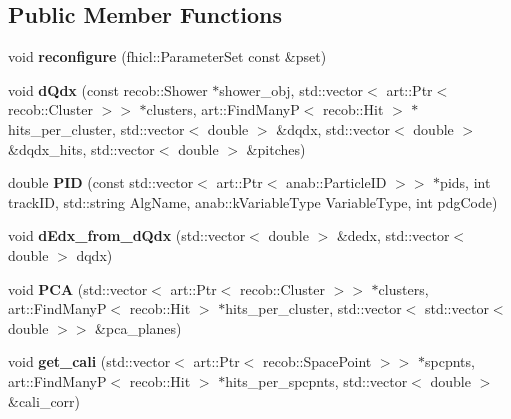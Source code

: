 \subsection*{Public Member Functions}
\begin{DoxyCompactItemize}
\item 
\hypertarget{classlee_1_1EnergyHelper_aa551642488e1a71f7b3d16965789a9f7}{void {\bfseries reconfigure} (fhicl\-::\-Parameter\-Set const \&pset)}\label{classlee_1_1EnergyHelper_aa551642488e1a71f7b3d16965789a9f7}

\item 
\hypertarget{classlee_1_1EnergyHelper_a4a3122ca6339e77bb3524fd1762a1f69}{void {\bfseries d\-Qdx} (const recob\-::\-Shower $\ast$shower\-\_\-obj, std\-::vector$<$ art\-::\-Ptr$<$ recob\-::\-Cluster $>$$>$ $\ast$clusters, art\-::\-Find\-Many\-P$<$ recob\-::\-Hit $>$ $\ast$hits\-\_\-per\-\_\-cluster, std\-::vector$<$ double $>$ \&dqdx, std\-::vector$<$ double $>$ \&dqdx\-\_\-hits, std\-::vector$<$ double $>$ \&pitches)}\label{classlee_1_1EnergyHelper_a4a3122ca6339e77bb3524fd1762a1f69}

\item 
\hypertarget{classlee_1_1EnergyHelper_a7731238e9b8545a22c3aa456025470bd}{double {\bfseries P\-I\-D} (const std\-::vector$<$ art\-::\-Ptr$<$ anab\-::\-Particle\-I\-D $>$$>$ $\ast$pids, int track\-I\-D, std\-::string Alg\-Name, anab\-::k\-Variable\-Type Variable\-Type, int pdg\-Code)}\label{classlee_1_1EnergyHelper_a7731238e9b8545a22c3aa456025470bd}

\item 
\hypertarget{classlee_1_1EnergyHelper_a54bc53c792be860c9b9eac24b6cc6729}{void {\bfseries d\-Edx\-\_\-from\-\_\-d\-Qdx} (std\-::vector$<$ double $>$ \&dedx, std\-::vector$<$ double $>$ dqdx)}\label{classlee_1_1EnergyHelper_a54bc53c792be860c9b9eac24b6cc6729}

\item 
\hypertarget{classlee_1_1EnergyHelper_a75cf4cee4e6db93d52022be00eb86302}{void {\bfseries P\-C\-A} (std\-::vector$<$ art\-::\-Ptr$<$ recob\-::\-Cluster $>$$>$ $\ast$clusters, art\-::\-Find\-Many\-P$<$ recob\-::\-Hit $>$ $\ast$hits\-\_\-per\-\_\-cluster, std\-::vector$<$ std\-::vector$<$ double $>$$>$ \&pca\-\_\-planes)}\label{classlee_1_1EnergyHelper_a75cf4cee4e6db93d52022be00eb86302}

\item 
\hypertarget{classlee_1_1EnergyHelper_a188cdbff934accbcf32bb658abea2412}{void {\bfseries get\-\_\-cali} (std\-::vector$<$ art\-::\-Ptr$<$ recob\-::\-Space\-Point $>$$>$ $\ast$spcpnts, art\-::\-Find\-Many\-P$<$ recob\-::\-Hit $>$ $\ast$hits\-\_\-per\-\_\-spcpnts, std\-::vector$<$ double $>$ \&cali\-\_\-corr)}\label{classlee_1_1EnergyHelper_a188cdbff934accbcf32bb658abea2412}


\end{DoxyCompactItemize}
